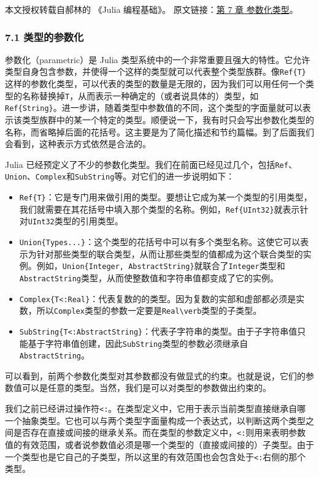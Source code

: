 
本文授权转载自郝林的 《Julia 编程基础》。 原文链接：\href{https://github.com/hyper0x/JuliaBasics/blob/master/book/ch07.md}{第 7 章 参数化类型}。


\subsubsection{7.1 类型的参数化}

参数化（parametric）是 Julia 类型系统中的一个非常重要且强大的特性。它允许类型自身包含参数，并使得一个这样的类型就可以代表整个类型族群。像\verb`Ref{T}`这样的参数化类型，可以代表的类型的数量是无限的，因为我们可以用任何一个类型的名称替换掉\verb`T`，从而表示一种确定的（或者说具体的）类型，如\verb`Ref{String}`。进一步讲，随着类型中参数值的不同，这个类型的字面量就可以表示该类型族群中的某一个特定的类型。顺便说一下，我有时只会写出参数化类型的名称，而省略掉后面的花括号。这主要是为了简化描述和节约篇幅。到了后面我们会看到，这种表示方式依然是合法的。

Julia 已经预定义了不少的参数化类型。我们在前面已经见过几个，包括\verb`Ref`、\verb`Union`、\verb`Complex`和\verb`SubString`等。对它们的进一步说明如下：

\begin{itemize}
\item \verb`Ref{T}`：它是专门用来做引用的类型。要想让它成为某一个类型的引用类型，我们就需要在其花括号中填入那个类型的名称。例如，\verb`Ref{UInt32}`就表示针对\verb`UInt32`类型的引用类型。
\item \verb`Union{Types...}`：这个类型的花括号中可以有多个类型名称。这使它可以表示为针对那些类型的联合类型，从而让那些类型的值都成为这个联合类型的实例。例如，\verb`Union{Integer, AbstractString}`就联合了\verb`Integer`类型和\verb`AbstractString`类型，从而使整数值和字符串值都变成了它的实例。
\item \verb`Complex{T<:Real}`：代表复数的的类型。因为复数的实部和虚部都必须是实数，所以\verb`Complex`类型的参数一定要是\verb`Real\verb`类型的子类型。
\item \verb`SubString{T<:AbstractString}`：代表子字符串的类型。由于子字符串值只能基于字符串值创建，因此\verb`SubString`类型的参数必须继承自\verb`AbstractString`。
\end{itemize}

可以看到，前两个参数化类型对其参数都没有做显式的约束。也就是说，它们的参数值可以是任意的类型。当然，我们是可以对类型的参数做出约束的。

我们之前已经讲过操作符\verb`<:`。在类型定义中，它用于表示当前类型直接继承自哪一个抽象类型。它也可以与两个类型字面量构成一个表达式，以判断这两个类型之间是否存在直接或间接的继承关系。而在类型的参数定义中，\verb`<:`则用来表明参数值的有效范围，或者说参数值必须是哪一个类型的（直接或间接的）子类型。由于一个类型也是它自己的子类型，所以这里的有效范围也会包含处于\verb`<:`右侧的那个类型。

